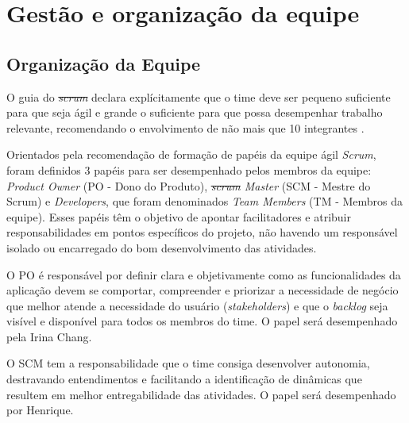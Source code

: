 \documentclass[
    12pt,               %
    openright,          %
    oneside,
    a4paper,            %
    BIBLATEX,           %
    TODO,               %
    english,            %
    brazil              %
    ]{ifsp-spo-inf-ctds}
\providecommand{\DIFadd}[1]{{\protect\color{blue}\uwave{#1}}} %
\providecommand{\DIFdel}[1]{{\protect\color{red}\sout{#1}}}                      %
\providecommand{\DIFaddbegin}{} %
\providecommand{\DIFaddend}{} %
\providecommand{\DIFdelbegin}{} %
\providecommand{\DIFdelend}{} %
\newcommand{\DIFscaledelfig}{0.5}
\newlength{\DIFdelgraphicswidth} %
\newlength{\DIFdelgraphicsheight} %
\newcommand{\DIFaddincludegraphics}[2][]{{\color{blue}\fbox{\DIFOincludegraphics[#1]{#2}}}} %
\newcommand{\DIFdelincludegraphics}[2][]{%
\sbox{\DIFdelgraphicsbox}{\DIFOincludegraphics[#1]{#2}}%
\settoboxwidth{\DIFdelgraphicswidth}{\DIFdelgraphicsbox} %
\settoboxtotalheight{\DIFdelgraphicsheight}{\DIFdelgraphicsbox} %
\scalebox{\DIFscaledelfig}{%
\parbox[b]{\DIFdelgraphicswidth}{\usebox{\DIFdelgraphicsbox}\\[-\baselineskip] \rule{\DIFdelgraphicswidth}{0em}}\llap{\resizebox{\DIFdelgraphicswidth}{\DIFdelgraphicsheight}{%
\setlength{\unitlength}{\DIFdelgraphicswidth}%
\begin{picture}(1,1)%
\thicklines\linethickness{2pt} %
{\color[rgb]{1,0,0}\put(0,0){\framebox(1,1){}}}%
{\color[rgb]{1,0,0}\put(0,0){\line( 1,1){1}}}%
{\color[rgb]{1,0,0}\put(0,1){\line(1,-1){1}}}%
\end{picture}%
}\hspace*{3pt}}} %
} %
\DeclareRobustCommand{\DIFaddbegin}{\DIFOaddbegin \let\includegraphics\DIFaddincludegraphics} %
\DeclareRobustCommand{\DIFaddend}{\DIFOaddend \let\includegraphics\DIFOincludegraphics} %
\DeclareRobustCommand{\DIFdelbegin}{\DIFOdelbegin \let\includegraphics\DIFdelincludegraphics} %
\DeclareRobustCommand{\DIFdelend}{\DIFOaddend \let\includegraphics\DIFOincludegraphics} %
\begin{document}
        











            
    


    \DIFaddend \section{Gestão e organização da equipe}

        \subsection{Organização da Equipe}

            O guia do \emph{\DIFdelbegin \DIFdel{scrum}\DIFdelend \DIFaddbegin \DIFadd{Scrum}\DIFaddend } declara explícitamente que o time deve ser pequeno suficiente para que seja ágil e grande o suficiente para que possa desempenhar trabalho relevante, recomendando o envolvimento de não mais que 10 integrantes .

            Orientados pela recomendação de formação de papéis da equipe ágil \emph{Scrum}, foram definidos 3 papéis para ser desempenhado pelos membros da equipe: \emph{Product Owner} (PO -  Dono do Produto), \emph{\DIFdelbegin \DIFdel{scrum }\DIFdelend \DIFaddbegin \DIFadd{Scrum }\DIFaddend Master} (SCM - Mestre do Scrum) e \emph{Developers}, que foram denominados \emph{Team Members} (TM - Membros da equipe). Esses papéis têm o objetivo de apontar facilitadores e atribuir responsabilidades em pontos específicos do projeto, não havendo um responsável isolado ou encarregado do bom desenvolvimento das atividades. 

            O PO é responsável por definir clara e objetivamente como as funcionalidades da aplicação devem se comportar, compreender e priorizar a necessidade de negócio que melhor atende a necessidade do usuário (\emph{stakeholders}) e que o \emph{backlog }seja visível e disponível para todos os membros do time. O papel será desempenhado pela Irina Chang.

            O SCM tem a responsabilidade que o time consiga desenvolver autonomia, destravando entendimentos e facilitando a identificação de dinâmicas que resultem em melhor entregabilidade das atividades. O papel será desempenhado por Henrique.
\end{document}
